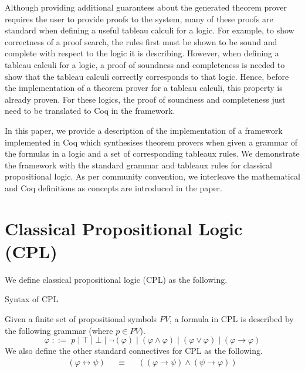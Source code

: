 \documentclass{llncs}
\begin{document}
Although providing additional guarantees about the generated theorem prover
requires the user to provide proofs to the system, many of these proofs are
standard when defining a useful tableau calculi for a logic. For example, to
show correctness of a proof search, the rules first must be shown to be sound
and complete with respect to the logic it is describing. However, when
defining a tableau calculi for a logic, a proof of soundness and completeness
is needed to show that the tableau calculi correctly corresponds to that logic.
Hence, before the implementation of a theorem prover for a tableau calculi,
this property is already proven. For these logics, the proof of soundness and
completeness just need to be translated to Coq in the framework.

In this paper, we provide a description of the implementation of a framework
implemented in Coq which synthesises theorem provers when given a grammar of
the formulas in a logic and a set of corresponding tableaux rules. We
demonstrate the framework with the standard grammar and tableaux rules for
classical propositional logic. As per community convention, we interleave the
mathematical and Coq definitions as concepts are introduced in the paper.
%
\section{Classical Propositional Logic (CPL)}
%
We define classical propositional logic (CPL) as the following.
%
\begin{definition}{Syntax of CPL}\label{Syntax of CPL}

Given a finite set of propositional symbols $PV$, a formula in CPL is
described by the following grammar (where $p \in PV$).
%
\begin{equation*}
\varphi \; ::= \; p \; \vert \; \top \; \vert \; \bot \; \vert \; \neg
(\varphi) \; \vert \; (\varphi \wedge \varphi) \; \vert \; (\varphi \vee
\varphi) \; \vert \; (\varphi \rightarrow \varphi)
\end{equation*}
%
We also define the other standard connectives for CPL as the following.
%
$$
\begin{array}{rlcll}
(\varphi \leftrightarrow \psi) &&\equiv&& ((\varphi \rightarrow \psi) \wedge
(\psi \rightarrow \varphi)) \\
\end{array}
$$
%
\end{definition}
\end{document}
